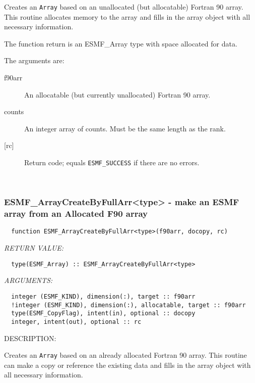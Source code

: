  
   Creates an {\tt Array} based on an unallocated (but allocatable) Fortran 
   90 array. This routine allocates memory to the array and fills in 
   the array object with all necessary information. 
   
   The function return is an ESMF\_Array type with space allocated for data. 
   
   The arguments are: 
   \begin{description} 
   \item[f90arr] 
   An allocatable (but currently unallocated) Fortran 90 array. 
   
   \item[counts] 
   An integer array of counts. Must be the same length as the rank. 
   
   \item[{[rc]}] 
   Return code; equals {\tt ESMF\_SUCCESS} if there are no errors. 
   \end{description} 
   
  
 
\mbox{}\hrulefill\ 
 
\subsubsection [ESMF\_ArrayCreateByFullArr<type>] {ESMF\_ArrayCreateByFullArr<type> - make an ESMF array from an Allocated F90 array }


  
\begin{verbatim}  function ESMF_ArrayCreateByFullArr<type>(f90arr, docopy, rc) 
   \end{verbatim}{\em RETURN VALUE:}
\begin{verbatim}  type(ESMF_Array) :: ESMF_ArrayCreateByFullArr<type> 
   \end{verbatim}{\em ARGUMENTS:}
\begin{verbatim}  integer (ESMF_KIND), dimension(:), target :: f90arr 
  !integer (ESMF_KIND), dimension(:), allocatable, target :: f90arr 
  type(ESMF_CopyFlag), intent(in), optional :: docopy 
  integer, intent(out), optional :: rc 
   \end{verbatim}
{\sf DESCRIPTION:\\ }

 
   Creates an {\tt Array} based on an already allocated Fortran 
   90 array. This routine can make a copy or reference the existing data 
   and fills in the array object with all necessary information. 
   
